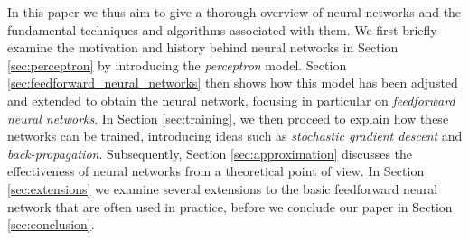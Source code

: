 In this paper we thus aim to give a thorough overview of neural networks and the fundamental techniques and algorithms associated with them. We first briefly examine the motivation and history behind neural networks in Section \ref{sec:perceptron} by introducing the \emph{perceptron} model. Section \ref{sec:feedforward_neural_networks} then shows how this model has been adjusted and extended to obtain the neural network, focusing in particular on \emph{feedforward neural networks}. In Section \ref{sec:training}, we then proceed to explain how these networks can be trained, introducing ideas such as \emph{stochastic gradient descent} and \emph{back-propagation}. Subsequently, Section \ref{sec:approximation} discusses the effectiveness of neural networks from a theoretical point of view. In Section \ref{sec:extensions} we examine several extensions to the basic feedforward neural network that are often used in practice, before we conclude our paper in Section \ref{sec:conclusion}.